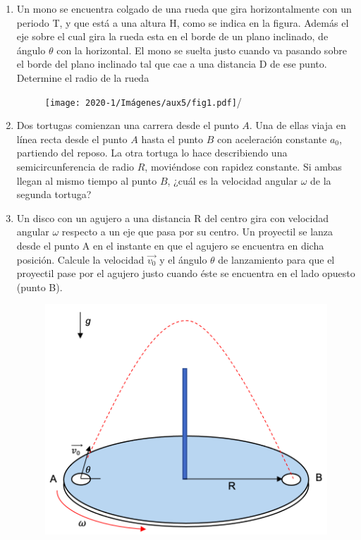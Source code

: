 \documentclass[letterpaper,11pt]{article}
\begin{document}
\begin{enumerate}
\item Un mono se encuentra colgado de una rueda que gira horizontalmente con un periodo T, y que está a una altura H, como se indica en la figura. Además el eje sobre el cual gira la rueda esta en el borde de un plano inclinado, de ángulo $\theta$ con la horizontal. El mono se suelta justo cuando va pasando sobre el borde del plano inclinado tal que cae a una distancia D de ese punto. Determine el radio de la rueda
\begin{figure}[H]
        \centering
        \texttt{[image: 2020-1/Imágenes/aux5/fig1.pdf]}/
\end{figure}

\item Dos tortugas comienzan una carrera desde el punto $A$. Una de ellas viaja en línea recta desde el punto $A$ hasta el punto $B$ con aceleración constante $a_0$, partiendo del reposo. La otra tortuga lo hace describiendo una semicircunferencia de radio $R$, moviéndose con rapidez constante. Si ambas llegan al mismo tiempo al punto $B$, ¿cuál es la velocidad angular $\omega$ de la segunda tortuga?
    
\begin{figure}[H]
    \centering
    \begin{subfigure}[t]{1\textwidth}
        \centering
        
    \end{subfigure}
\end{figure}

\item Un disco con un agujero a una distancia R del centro gira con velocidad angular $\omega$ respecto a un eje que pasa por su centro. Un proyectil se lanza desde el punto A en el instante en que el agujero se encuentra en dicha posición. Calcule la velocidad $\vec{v_0}$ y el ángulo $\theta$ de lanzamiento para que el proyectil pase por el agujero justo cuando éste se encuentra en el lado opuesto (punto B).

\begin{figure}[H]
    \centering
    \includegraphics[width=0.4\linewidth]{2021-2/img/ejercicios/imagen_ej3.png}
\end{figure}


\end{enumerate}
\end{document}
